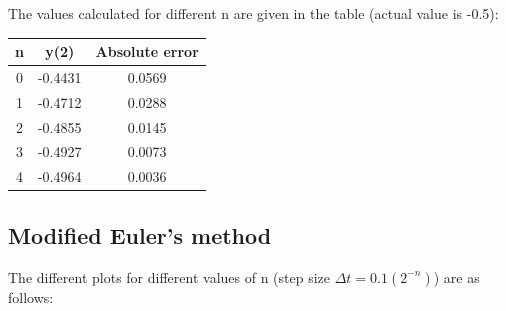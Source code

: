 \documentclass[12pt,letterpaper]{article}
\begin{document}
The values calculated for different n are given in the table (actual value is -0.5):

\begin{center}
\begin{tabular}{c c c}
\hline
n	&		y(2)	&	Absolute error\\
\hline
0	&	-0.4431		&	0.0569\\
1	&	-0.4712		&	0.0288\\
2	&	-0.4855		&	0.0145\\
3	&	-0.4927		&	0.0073\\
4	&	-0.4964		&	0.0036\\
\hline
\end{tabular}
\end{center}

\newpage

\subsection*{Modified Euler's method}

The different plots for different values of n (step size $\Delta t = 0.1(2^{-n})$) are as follows:
\end{document}
